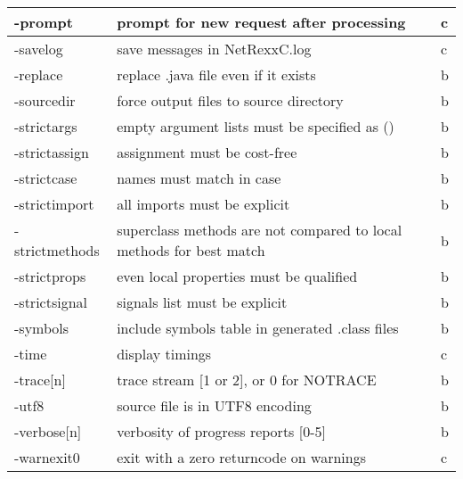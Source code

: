 \begin{longtable}[l]{|l|p{10cm}|l|}
\hline
-prompt       & prompt for new request after processing &c \\
\hline
-savelog      & save messages in NetRexxC.log &c \\
\hline
 -replace      & replace .java file even if it exists &b \\
\hline
 -sourcedir    & force output files to source directory &b \\
\hline
  -strictargs   & empty argument lists must be specified as () &b \\
\hline
  -strictassign & assignment must be cost-free &b \\
\hline
  -strictcase   & names must match in case &b \\
\hline
  -strictimport & all imports must be explicit &b \\
\hline
  -strictmethods & superclass methods are not compared to local methods for best match &b \\
\hline
  -strictprops  & even local properties must be qualified &b \\
\hline
  -strictsignal & signals list must be explicit &b \\
\hline
  -symbols      & include symbols table in generated .class files &b \\
\hline
-time         & display timings &c \\
\hline
 -trace[n]     & trace stream [1 or 2], or 0 for NOTRACE &b \\
\hline
 -utf8         & source file is in UTF8 encoding &b \\
\hline
 -verbose[n]   & verbosity of progress reports [0-5] &b \\
\hline
 -warnexit0    & exit with a zero returncode on warnings &c \\
\hline
\end{longtable}

